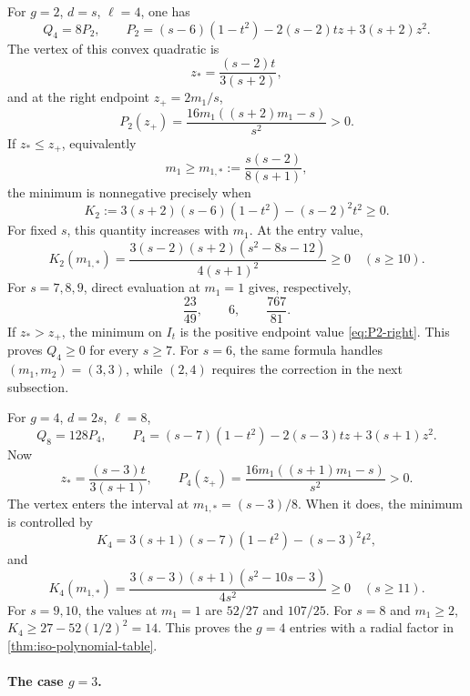 For \(g=2\), \(d=s\), \(\ell=4\), one has
\begin{equation}\label{eq:P2}
 Q_4=8P_2,\qquad
 P_2=(s-6)(1-t^2)-2(s-2)tz+3(s+2)z^2.
\end{equation}
The vertex of this convex quadratic is
\[
 z_*=\frac{(s-2)t}{3(s+2)},
\]
and at the right endpoint \(z_+=2m_1/s\),
\begin{equation}\label{eq:P2-right}
 P_2(z_+)=\frac{16m_1((s+2)m_1-s)}{s^2}>0.
\end{equation}
If \(z_*\leq z_+\), equivalently
\[
 m_1\geq m_{1,*}:=\frac{s(s-2)}{8(s+1)},
\]
the minimum is nonnegative precisely when
\begin{equation}\label{eq:K2}
 K_2:=3(s+2)(s-6)(1-t^2)-(s-2)^2t^2\geq0.
\end{equation}
For fixed \(s\), this quantity increases with \(m_1\).  At the entry value,
\begin{equation}\label{eq:K2-entry}
 K_2(m_{1,*})=
 \frac{3(s-2)(s+2)(s^2-8s-12)}{4(s+1)^2}\geq0
 \quad(s\geq10).
\end{equation}
For \(s=7,8,9\), direct evaluation at \(m_1=1\) gives, respectively,
\[
 \frac{23}{49},\qquad6,\qquad\frac{767}{81}.
\]
If \(z_*>z_+\), the minimum on \(I_t\) is the positive endpoint value
\eqref{eq:P2-right}.  This proves \(Q_4\geq0\) for every \(s\geq7\).
For \(s=6\), the same formula handles \((m_1,m_2)=(3,3)\), while
\((2,4)\) requires the correction in the next subsection.

For \(g=4\), \(d=2s\), \(\ell=8\),
\begin{equation}\label{eq:P4}
 Q_8=128P_4,\qquad
 P_4=(s-7)(1-t^2)-2(s-3)tz+3(s+1)z^2.
\end{equation}
Now
\[
 z_*=\frac{(s-3)t}{3(s+1)},
 \qquad
 P_4(z_+)=\frac{16m_1((s+1)m_1-s)}{s^2}>0.
\]
The vertex enters the interval at \(m_{1,*}=(s-3)/8\).  When it does, the
minimum is controlled by
\begin{equation}\label{eq:K4}
 K_4=3(s+1)(s-7)(1-t^2)-(s-3)^2t^2,
\end{equation}
and
\begin{equation}\label{eq:K4-entry}
 K_4(m_{1,*})=
 \frac{3(s-3)(s+1)(s^2-10s-3)}{4s^2}\geq0
 \quad(s\geq11).
\end{equation}
For \(s=9,10\), the values at \(m_1=1\) are \(52/27\) and \(107/25\).
For \(s=8\) and \(m_1\geq2\),
\(K_4\geq27-52(1/2)^2=14\).  This proves the \(g=4\) entries with a radial factor in
\cref{thm:iso-polynomial-table}.

\paragraph{The case \texorpdfstring{\(g=3\)}{g=3}.}

